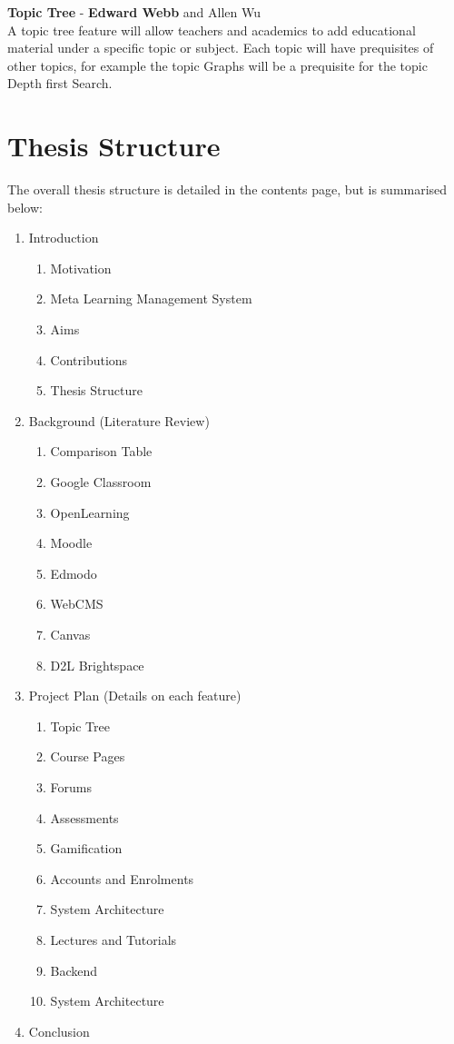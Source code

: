\textbf{Topic Tree} - \textbf{Edward Webb} and Allen Wu \\
A topic tree feature will allow teachers and academics to add educational material under a specific topic or subject. Each topic will have prequisites of other topics, for example the topic Graphs will be a prequisite for the topic Depth first Search.

\section{Thesis Structure}
The overall thesis structure is detailed in the contents page, but is summarised below:

\begin{enumerate}
\item Introduction
    \begin{enumerate}
    \item Motivation
    \item Meta Learning Management System
    \item Aims
    \item Contributions
    \item Thesis Structure
    \end{enumerate}
\item Background (Literature Review)
    \begin{enumerate}
    \item Comparison Table
    \item Google Classroom
    \item OpenLearning
    \item Moodle
    \item Edmodo
    \item WebCMS
    \item Canvas
    \item D2L Brightspace
    \end{enumerate}
\item Project Plan (Details on each feature)
    \begin{enumerate}
    \item Topic Tree
    \item Course Pages
    \item Forums
    \item Assessments
    \item Gamification
    \item Accounts and Enrolments
    \item System Architecture
    \item Lectures and Tutorials
    \item Backend
    \item System Architecture
    \end{enumerate}
\item Conclusion
\end{enumerate}